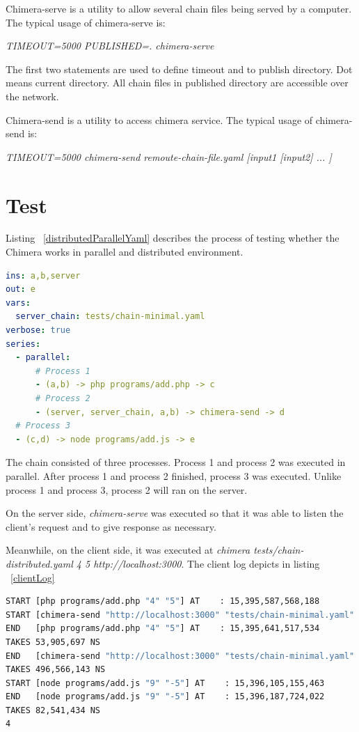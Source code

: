 \documentclass[conference]{IEEEtran}
\begin{document}
Chimera-serve is a utility to allow several chain files being served by a computer.
The typical usage of chimera-serve is:

{\it TIMEOUT=5000 PUBLISHED=. chimera-serve}

The first two statements are used to define timeout and to publish directory. Dot means
current directory. All chain files in published directory are accessible over the network.

Chimera-send is a utility to access chimera service.
The typical usage of chimera-send is: 

{\it TIMEOUT=5000 chimera-send remoute-chain-file.yaml [input1 [input2] ... ]}


\section{Test}

Listing ~\ref{distributedParallelYaml} describes the process of testing whether the Chimera works
in parallel and distributed environment.

\begin{lstlisting}[caption=Distributed and Parallel YAML-chain Scenario, label=distributedParallelYaml, language=yaml, basicstyle=\small, breaklines=true]
ins: a,b,server
out: e
vars:
  server_chain: tests/chain-minimal.yaml 
verbose: true
series:
  - parallel:
      # Process 1
      - (a,b) -> php programs/add.php -> c
      # Process 2
      - (server, server_chain, a,b) -> chimera-send -> d
  # Process 3
  - (c,d) -> node programs/add.js -> e
\end{lstlisting}

The chain consisted of three processes. Process 1 and process 2 was executed in parallel.
After process 1 and process 2 finished, process 3 was executed. Unlike process 1 and
process 3, process 2 will ran on the server.

On the server side, {\it chimera-serve} was executed so that it was able to listen the client's request
and to give response as necessary.

Meanwhile, on the client side, it was executed at {\it chimera tests/chain-distributed.yaml 4 5 http://localhost:3000}. The client log depicts in listing ~\ref{clientLog} 

\begin{lstlisting}[caption=Client Log, label=clientLog, language=bash, basicstyle=\small, breaklines=true]
START [php programs/add.php "4" "5"] AT    : 15,395,587,568,188
START [chimera-send "http://localhost:3000" "tests/chain-minimal.yaml" "4" "5"] AT    : 15,395,607,233,624
END   [php programs/add.php "4" "5"] AT    : 15,395,641,517,534
TAKES 53,905,697 NS
END   [chimera-send "http://localhost:3000" "tests/chain-minimal.yaml" "4" "5"] AT    : 15,396,103,823,215
TAKES 496,566,143 NS
START [node programs/add.js "9" "-5"] AT    : 15,396,105,155,463
END   [node programs/add.js "9" "-5"] AT    : 15,396,187,724,022
TAKES 82,541,434 NS
4
\end{lstlisting}
\end{document}
